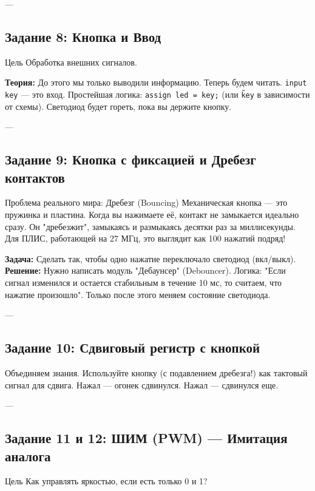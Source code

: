 \documentclass[12pt, a4paper]{article}
\begin{document}
---

\subsection{Задание 8: Кнопка и Ввод}
\begin{taskbox}{Цель}
Обработка внешних сигналов.
\end{taskbox}

\textbf{Теория:}
До этого мы только выводили информацию. Теперь будем читать.
\texttt{input key} — это вход.
Простейшая логика: \texttt{assign led = key;} (или \texttt{\~key} в зависимости от схемы).
Светодиод будет гореть, пока вы держите кнопку.

---

\subsection{Задание 9: Кнопка с фиксацией и Дребезг контактов}
\begin{warning}{Проблема реального мира: Дребезг (Bouncing)}
Механическая кнопка — это пружинка и пластина. Когда вы нажимаете её, контакт не замыкается идеально сразу. Он "дребезжит", замыкаясь и размыкаясь десятки раз за миллисекунды.
Для ПЛИС, работающей на 27 МГц, это выглядит как 100 нажатий подряд!
\end{warning}

\textbf{Задача:} Сделать так, чтобы одно нажатие переключало светодиод (вкл/выкл).
\textbf{Решение:} Нужно написать модуль "Дебаунсер" (Debouncer). Логика: "Если сигнал изменился и остается стабильным в течение 10 мс, то считаем, что нажатие произошло". Только после этого меняем состояние светодиода.

---

\subsection{Задание 10: Сдвиговый регистр с кнопкой}
Объединяем знания. Используйте кнопку (с подавлением дребезга!) как тактовый сигнал для сдвига.
Нажал — огонек сдвинулся. Нажал — сдвинулся еще.

---

\subsection{Задание 11 и 12: ШИМ (PWM) — Имитация аналога}
\begin{taskbox}{Цель}
Как управлять яркостью, если есть только 0 и 1?
\end{taskbox}
\end{document}
